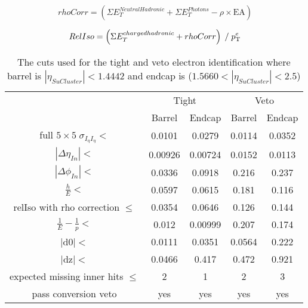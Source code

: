 \begin{centering}
\begin{equation}
rhoCorr = \left( \Sigma E_{T}^{Neutral Hadronic} + \Sigma E_{T}^{Photons} - \rho\times\textrm{EA} \right) 
\label{eqn:rhoCorr}
\end{equation}
\end{centering}


\begin{centering}
\begin{equation}
RelIso = \left( \Sigma E_{T}^{charged hadronic} + rhoCorr \right) \; / \;   p_{\mathrm{T}}^{e}
\label{eqn:dBRelIso}
\end{equation}
\end{centering}

\begin{table}[htpb!]
\footnotesize
\begin{center}
\begin{tabular}{c|c|c|c|c}
\hline
& \multicolumn{2}{c|}{Tight} & \multicolumn{2}{c}{Veto} \\
\cline{2-5}
&  Barrel        &   Endcap  &  Barrel        &   Endcap  \\

\hline
full $5\times5 \; \sigma_{I_{\eta}I_{\eta}} < $ & 0.0101 & 0.0279 & 0.0114 & 0.0352\\
$|\Delta \eta_{In}| < $  & 0.00926 & 0.00724  & 0.0152 & 0.0113  \\
$|\Delta \phi_{In}| < $  &  0.0336 & 0.0918 &  0.216 & 0.237  \\
$\frac{h}{E} <$ &0.0597 & 0.0615  &0.181 & 0.116  \\
relIso with rho correction  $\leq$  & 0.0354 & 0.0646& 0.126 & 0.144\\
$\frac{1}{E} - \frac{1}{p} < $ & 0.012 & 0.00999  & 0.207 & 0.174 \\
$|$d$0| < $  & 0.0111 & 0.0351  & 0.0564 & 0.222\\
$|$dz$| < $  & 0.0466 & 0.417 & 0.472 & 0.921\\
expected missing inner hits $\leq$ & 2 & 1 & 2 & 3  \\
pass conversion veto & yes & yes& yes & yes  \\
\hline
\end{tabular}
\caption{The cuts used for the tight and veto electron identification where barrel is $|\eta_{SuCluster}|< 1.4442$ and endcap is  ($1.5660<|\eta_{SuCluster}|<2.5$)}
\label{tab:electron_tight_cuts}
\end{center}
\end{table}


